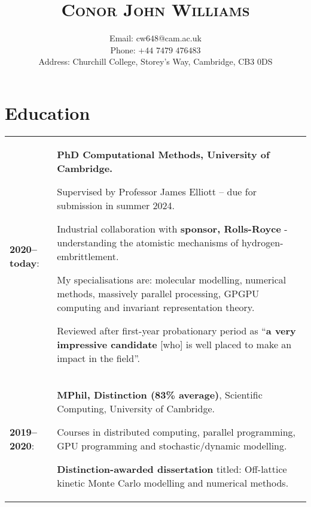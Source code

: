 \documentclass[11pt]{article}
\title{\Huge\textsc{Conor John Williams}}
\date{}
\author{Email: cw$648$@cam.ac.uk \\ Phone: $+44$ $7479$ $476483$ \\ Address: Churchill College, Storey's Way, Cambridge, CB$3$ $0$DS}
\renewcommand{\arraystretch}{1.4} %
\begin{document}
\maketitle

\thispagestyle{empty}

\renewcommand{\arraystretch}{1.5} %

\section*{Education} \label{sec:intro}

\begin{tabular}{@{}lp{}@{}}
    \textbf{2020--today}: & \textbf{PhD Computational Methods, University of Cambridge.}

    \vspace{0.5em}
    
    Supervised by Professor James Elliott – due for submission in summer 2024.
    
    \vspace{0.5em}
    
    Industrial collaboration with \textbf{sponsor, Rolls-Royce} - understanding the atomistic mechanisms of hydrogen-embrittlement.  
    
    \vspace{0.5em}
    
    My specialisations are: molecular modelling, numerical methods, massively parallel processing, GPGPU computing and invariant representation theory.
    
    \vspace{0.5em}
    
    Reviewed after first-year probationary period as ``\textbf{a very impressive candidate} [who] is well placed to make an impact in the field''.      \\
    
    \textbf{2019--2020}:  & \textbf{MPhil, Distinction (\num{83}\% average)}, Scientific Computing, University of Cambridge.
    
    \vspace{0.5em}
    
    Courses in distributed computing, parallel programming, GPU programming and stochastic/dynamic modelling.
    
    \vspace{0.5em}
    
    \textbf{Distinction-awarded dissertation} titled: Off-lattice kinetic Monte Carlo modelling and numerical methods.                                  \\
    

\end{tabular}
\end{document}

